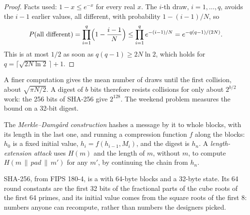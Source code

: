 \begin{proof}
Facts used: $1 - x \le e^{-x}$ for every real $x$. The $i$-th draw, $i = 1, \ldots, q$, avoids the $i - 1$ earlier values, all different, with probability $1 - (i - 1)/N$, so
\[ P(\text{all different}) = \prod_{i=1}^{q} \Bigl(1 - \frac{i - 1}{N}\Bigr) \le \prod_{i=1}^{q} e^{-(i-1)/N} = e^{-q(q - 1)/(2N)}. \]
This is at most $1/2$ as soon as $q(q - 1) \ge 2N \ln 2$, which holds for $q = \lceil \sqrt{2N \ln 2}\, \rceil + 1$.
\end{proof}

A finer computation gives the mean number of draws until the first collision, about $\sqrt{\pi N / 2}$. A digest of $b$ bits therefore resists collisions for only about $2^{b/2}$ work: the 256 bits of SHA-256 give $2^{128}$. The weekend problem measures the bound on a 32-bit digest.

\begin{definition}\label{def:b3:symmetric-cryptography:md}
The \emph{Merkle--Damgård construction} hashes a message by  it to whole blocks, with its length in the last one, and running a compression function $f$ along the blocks: $h_0$ is a fixed initial value, $h_i = f(h_{i-1}, M_i)$, and the digest is $h_n$. A \emph{length-extension attack} uses $H(m)$ and the length of $m$, without $m$, to compute $H(m \,\|\, \mathit{pad} \,\|\, m')$ for any $m'$, by continuing the chain from $h_n$.
\end{definition}

SHA-256, from FIPS 180-4, is a  with 64-byte blocks and a 32-byte state. Its 64 round constants are the first 32 bits of the fractional parts of the cube roots of the first 64 primes, and its initial value comes from the square roots of the first 8: numbers anyone can recompute, rather than numbers the designers picked. %

\label{lst:b3:symmetric-cryptography:sha}

\label{out:b3:symmetric-cryptography:sha}


